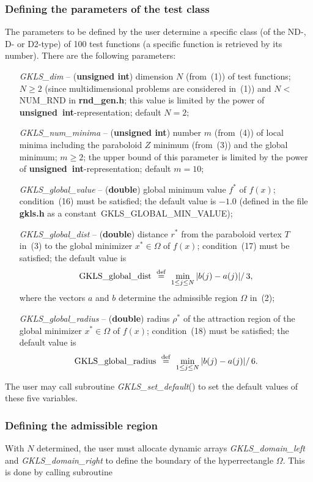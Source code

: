 \documentclass[acmtoms]{acmtrans2m}
\begin{document}
\subsubsection{Defining the parameters of the test class}
The parameters to be defined by the user determine a specific
class (of the ND-, D- or D2-type) of 100 test functions (a
specific function is retrieved by its number). There are the
following parameters:
 \begin{itemize}
  \item[{\it GKLS\_dim}] -- ({\bf unsigned int}) dimension $N$
  (from~(1)) of test functions; $N \geq 2$ (since
  multidimensional problems are considered in~(1)) and
  $N<$ NUM\_RND in {\bf rnd\_gen.h}; this value is limited by the
  power of \mbox{{\bf unsigned int}}-representation; default
  $N=2$;
  \item[{\it GKLS\_num\_minima}] -- ({\bf unsigned int}) number $m$
  (from~(4)) of local minima including the paraboloid $Z$
  minimum (from~(3)) and the global minimum; $m \geq 2$; the
  upper bound of this parameter is limited by the power of
  \mbox{{\bf unsigned int}}-representation;
  default $m=10$;
  \item[{\it GKLS\_global\_value}] -- ({\bf double}) global minimum value $f^*$ of
  $f(x)$; condition~(16) must be satisfied; the default
  value is $-1.0$ (defined in the file {\bf gkls.h} as a constant~GKLS\_GLOBAL\_MIN\_VALUE);

  \item[{\it GKLS\_global\_dist}] -- ({\bf double}) distance $r^*$ from the paraboloid
  vertex $T$ in~(3) to the global minimizer $x^* \in \Omega$
  of $f(x)$; condition~(17) must be
  satisfied; the default value is
  $$
    {\rm GKLS\_global\_dist}\ \stackrel{\rm def}{=} \ \min_{1 \leq j
    \leq N} |  b(j) - a(j) |  /\, 3,
  $$
  where the vectors $a$ and $b$ determine the admissible region
  $\Omega$ in~(2);
  \item[{\it GKLS\_global\_radius}] -- ({\bf double}) radius $\rho ^*$ of the attraction
  region of the global
  minimizer $x^*\in \Omega$ of $f(x)$; condition~(18) must be
  satisfied; the default value is
  $$
    {\rm GKLS\_global\_radius}\ \stackrel{\rm def}{=} \ \min_{1 \leq
    j \leq N} |  b(j) - a(j) |  /\, 6.
  $$
 \end{itemize}
The user may call subroutine \mbox{{\it GKLS\_set\_default}()} to
set the default values of these five variables.

\subsubsection{Defining the admissible region} \label{sectionOmega}
With $N$ determined, the user must allocate dynamic arrays {\it
GKLS\_domain\_left} and {\it GKLS\_domain\_right} to define the
boundary of the hyperrectangle $\Omega$. This is done by calling
subroutine
\end{document}
